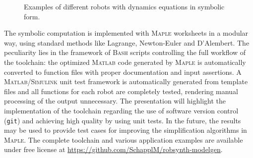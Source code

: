 \documentclass[runningheads]{llncs}
\begin{document}
\begin{figure}[h]
	\small %
	\vspace{-0.6cm}
	
	\vspace{-0.7cm}
	\caption{Examples of different robots with dynamics equations in symbolic form.}
	\vspace{-0.5cm}
	\label{fig:robot_examples}
\end{figure} 

The symbolic computation is implemented with \textsc{Maple} worksheets in a modular way, using standard methods like Lagrange, Newton-Euler and D'Alembert.
The peculiarity lies in the framework of \textsc{Bash} scripts controlling the full workflow of the toolchain:
the optimized \textsc{Matlab} code generated by \textsc{Maple} is automatically converted to function files with proper documentation and input assertions.
A \textsc{Matlab/Simulink} unit test framework is automatically generated from template files and all functions for each robot are completely tested, rendering manual processing of the output unnecessary.
The presentation will highlight the implementation of the toolchain regarding the use of software version control (\texttt{git}) and achieving high quality by using unit tests.
In the future, the results may be used to provide test cases for improving the simplification algorithms in \textsc{Maple}.
%
The complete toolchain and various application examples are available under free license at 
\url{https://github.com/SchapplM/robsynth-modelgen}.
%
%
%
%
%
\end{document}
